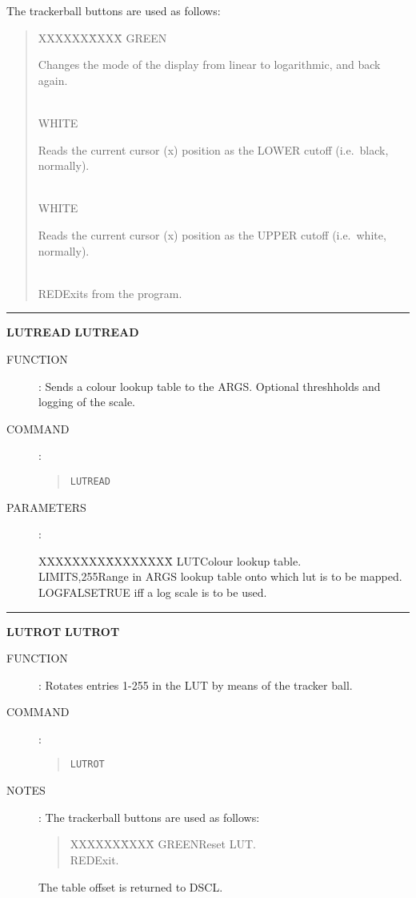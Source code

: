 \begin{description}
The trackerball buttons are used as follows:
\begin{quote}
\begin{tabbing}
XXXXXX\=XXXX\=\kill
GREEN\>\begin{minipage}[t]{100mm}
Changes the mode of the display from linear to logarithmic, and back again.
\end{minipage}\\
WHITE\>\begin{minipage}[t]{100mm}
Reads the current cursor (x) position as the LOWER cutoff (i.e.\ black,
normally).
\end{minipage}\\
WHITE\>\begin{minipage}[t]{100mm}
Reads the current cursor (x) position as the UPPER cutoff (i.e.\ white,
normally).
\end{minipage}\\
RED\>Exits from the program.
\end{tabbing}
\end{quote}
\end{description}

\goodbreak
\rule{\textwidth}{0.3mm}
{\Large {\bf LUTREAD} \hfill {\bf LUTREAD}}
\begin{description}
\item [FUNCTION]:
Sends a colour lookup table to the ARGS.
Optional threshholds and logging of the scale.
\item [COMMAND]:
\begin{quote}
{\tt LUTREAD}
\end{quote}
\item [PARAMETERS] :
\begin{tabbing}
XXXXXXXX\=XXXXXXXX\=\kill
LUT\>\>Colour lookup table.\\
LIMITS,255\>Range in ARGS lookup table onto which lut is to be mapped.\\
LOG\>FALSE\>TRUE iff a log scale is to be used.
\end{tabbing}
\end{description}

\goodbreak
\rule{\textwidth}{0.3mm}
{\Large {\bf LUTROT} \hfill {\bf LUTROT}}
\begin{description}
\item [FUNCTION]:
Rotates entries 1-255 in the LUT by means of the tracker ball.
\item [COMMAND]:
\begin{quote}
{\tt LUTROT}
\end{quote}
\item [NOTES]:
The trackerball buttons are used as follows:
\begin{quote}
\begin{tabbing}
XXXXXX\=XXXX\=\kill
GREEN\>Reset LUT.\\
RED\>Exit.
\end{tabbing}
\end{quote}
The table offset is returned to DSCL.
\end{description}


